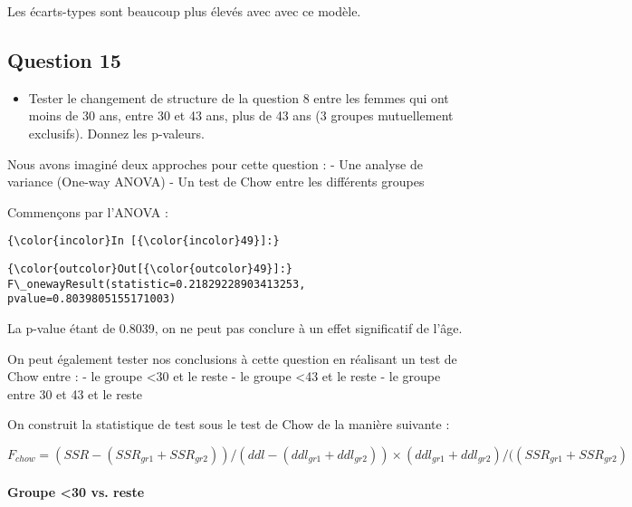 \documentclass[11pt]{article}
\providecommand{\tightlist}{%
      \setlength{\itemsep}{0pt}\setlength{\parskip}{0pt}}
\begin{document}
    Les écarts-types sont beaucoup plus élevés avec avec ce modèle.

    \subsection{Question 15}\label{question-15}

\begin{itemize}
\tightlist
\item
  Tester le changement de structure de la question 8 entre les femmes
  qui ont moins de 30 ans, entre 30 et 43 ans, plus de 43 ans (3 groupes
  mutuellement exclusifs). Donnez les p-valeurs. 
\end{itemize}

    Nous avons imaginé deux approches pour cette question : - Une analyse de
variance (One-way ANOVA) - Un test de Chow entre les différents groupes

    Commençons par l'ANOVA :

    \begin{Verbatim}[commandchars=\\\{\}]
{\color{incolor}In [{\color{incolor}49}]:} 
\end{Verbatim}


\begin{Verbatim}[commandchars=\\\{\}]
{\color{outcolor}Out[{\color{outcolor}49}]:} F\_onewayResult(statistic=0.21829228903413253, pvalue=0.8039805155171003)
\end{Verbatim}
            
    La p-value étant de 0.8039, on ne peut pas conclure à un effet
significatif de l'âge.

    On peut également tester nos conclusions à cette question en réalisant
un test de Chow entre : - le groupe \textless{}30 et le reste - le
groupe \textless{}43 et le reste - le groupe entre 30 et 43 et le reste

    On construit la statistique de test sous le test de Chow de la manière
suivante :

\[ F_{chow} = ( SSR - (SSR_{gr1} + SSR_{gr2}) ) / ( ddl - (ddl_{gr1} + ddl_{gr2}) ) \times ( ddl_{gr1} + ddl_{gr2} ) / ( (SSR_{gr1} + SSR_{gr2} ) \]

    \paragraph{Groupe \textless{}30 vs. reste}\label{groupe-30-vs.-reste}
\end{document}
